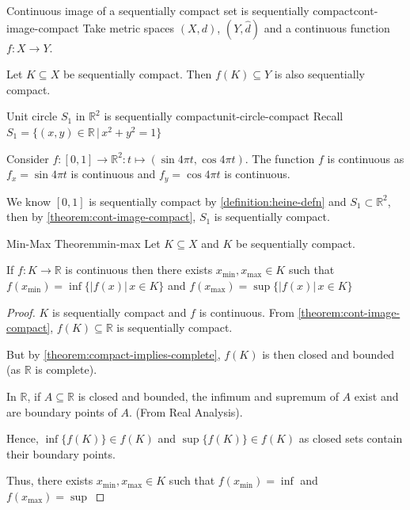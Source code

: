 \documentclass{article}
\numberwithin{equation}{section}
\numberwithin{figure}{section}
\begin{document}
\begin{theorem}{Continuous image of a sequentially compact set is sequentially compact}{cont-image-compact}
    Take metric spaces $(X,d)$, $(Y, \hat{d})$ and a continuous function $f: X \to Y$.

    Let $K \subseteq X$ be sequentially compact. Then $f(K) \subseteq Y$ is also sequentially compact. 
\end{theorem}
\begin{example}{Unit circle \texorpdfstring{$S_1$}{} in \texorpdfstring{$\mathbb{R}^2$}{two-dimensional Euclidean space} is sequentially compact}{unit-circle-compact}
    Recall $S_1 = \{(x,y)\in \mathbb{R} \,\vert\, x^2+y^2=1\}$

    Consider $f:[0,1]\to \mathbb{R}^2 : t \mapsto (\sin{4\pi t}, \cos{4\pi t})$. The function $f$ is continuous as $f_x=\sin{4\pi t}$ is continuous and $f_y=\cos{4\pi t}$ is continuous.

    We know $[0,1]$ is sequentially compact by \cref{definition:heine-defn} and $S_1 \subset \mathbb{R}^2$, then by \cref{theorem:cont-image-compact}, $S_1$ is sequentially compact.
\end{example}
\begin{theorem}{Min-Max Theorem}{min-max}
    Let $K \subseteq X$ and $K$ be sequentially compact.

    If $f: K \to \mathbb{R}$ is continuous then there exists $x_{\min},x_{\max}\in K$ such that $f(x_{\min})=\inf\{|f(x)| \, x \in K\}$ and $f(x_{\max})=\sup\{|f(x)| \, x \in K\}$

    \begin{proof}
        $K$ is sequentially compact and $f$ is continuous. From \cref{theorem:cont-image-compact}, $f(K)\subseteq \mathbb{R}$ is sequentially compact.

        But by \cref{theorem:compact-implies-complete},  $f(K)$ is then closed and bounded (as $\mathbb{R}$ is complete).

        In $\mathbb{R}$, if $A \subseteq \mathbb{R}$ is closed and bounded, the infimum and supremum of $A$ exist and are boundary points of $A$. (From Real Analysis).

        Hence, $\inf\{f(K)\} \in f(K)$ and $\sup\{f(K)\} \in f(K)$ as closed sets contain their boundary points.

        Thus, there exists $x_{\min},x_{\max} \in K$
        such that $f(x_{\min})=\inf$ and $f(x_{\max})=\sup$
\end{proof}
\end{theorem}
\end{document}
